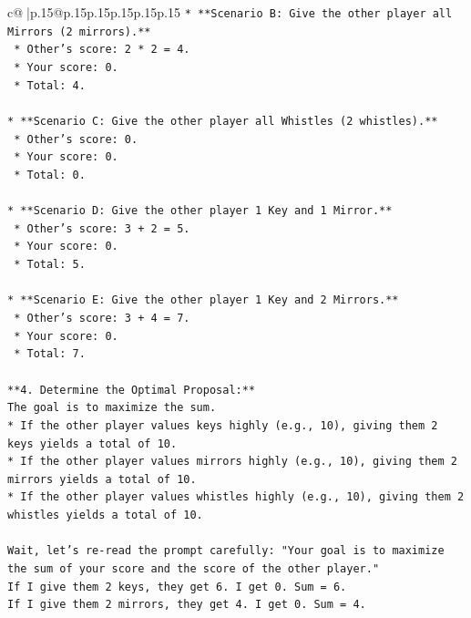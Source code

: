 \documentclass{article}
\begin{document}
{\begin{supertabular}{c@{$\;$}|p{.15\linewidth}@{}p{.15\linewidth}p{.15\linewidth}p{.15\linewidth}p{.15\linewidth}p{.15\linewidth}}
{{{\texttt{*   **Scenario B: Give the other player all Mirrors (2 mirrors).**} \\
\texttt{    *   Other's score: 2 * 2 = 4.} \\
\texttt{    *   Your score: 0.} \\
\texttt{    *   Total: 4.} \\
\\ 
\texttt{*   **Scenario C: Give the other player all Whistles (2 whistles).**} \\
\texttt{    *   Other's score: 0.} \\
\texttt{    *   Your score: 0.} \\
\texttt{    *   Total: 0.} \\
\\ 
\texttt{*   **Scenario D: Give the other player 1 Key and 1 Mirror.**} \\
\texttt{    *   Other's score: 3 + 2 = 5.} \\
\texttt{    *   Your score: 0.} \\
\texttt{    *   Total: 5.} \\
\\ 
\texttt{*   **Scenario E: Give the other player 1 Key and 2 Mirrors.**} \\
\texttt{    *   Other's score: 3 + 4 = 7.} \\
\texttt{    *   Your score: 0.} \\
\texttt{    *   Total: 7.} \\
\\ 
\texttt{**4. Determine the Optimal Proposal:**} \\
\texttt{The goal is to maximize the sum.} \\
\texttt{*   If the other player values keys highly (e.g., 10), giving them 2 keys yields a total of 10.} \\
\texttt{*   If the other player values mirrors highly (e.g., 10), giving them 2 mirrors yields a total of 10.} \\
\texttt{*   If the other player values whistles highly (e.g., 10), giving them 2 whistles yields a total of 10.} \\
\\ 
\texttt{Wait, let's re{-}read the prompt carefully: "Your goal is to maximize the sum of your score and the score of the other player."} \\
\texttt{If I give them 2 keys, they get 6. I get 0. Sum = 6.} \\
\texttt{If I give them 2 mirrors, they get 4. I get 0. Sum = 4.} \\
}}}
\end{supertabular}}
\end{document}
